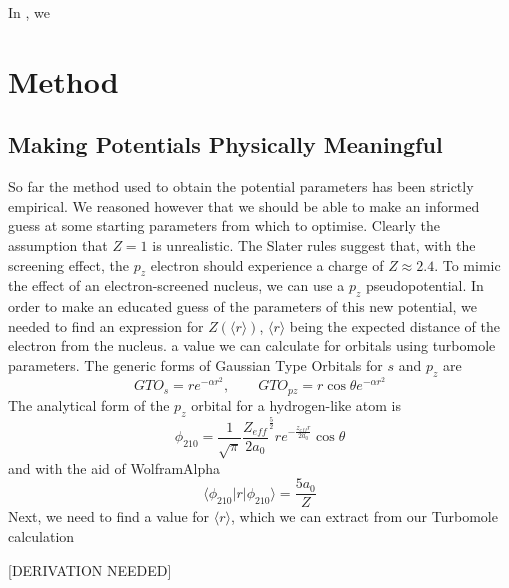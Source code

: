 \documentclass[journal=jctcce,manuscript=article]{achemso}
\begin{document}
In \cite{drujon_pseudopotentials_2013}, we 

\section{Method}

\subsection{Making Potentials Physically Meaningful}

So far the method used to obtain the potential parameters has been strictly empirical. We reasoned however that we should be able to make an informed guess at some starting parameters from which to optimise. Clearly the assumption that \(Z = 1\) is unrealistic. The Slater rules suggest that, with the screening effect, the \(p_{z}\) electron should experience a charge of \(Z \approx 2.4\). To mimic the effect of an electron-screened nucleus, we can use a \(p_{z}\) pseudopotential. In order to make an educated guess of the parameters of this new potential, we needed to find an expression for \(Z(\langle r \rangle)\), \( \langle r \rangle \) being the expected distance of the electron from the nucleus. a value we can calculate for orbitals using turbomole parameters.
	The generic forms of Gaussian Type Orbitals for \(s\) and \(p_{z}\) are
\begin{equation}
GTO_{s} = re^{-\alpha r^{2}},\qquad	GTO_{pz} = r \cos \theta e^{-\alpha r^{2}}
\end{equation}
The analytical form of the \(p_{z}\) orbital for a hydrogen-like atom is
\begin{equation}
\phi_{210} = \frac{1}{\sqrt{\pi}} \frac{Z_{eff}}{2a_{0}} ^{\frac{5}{2}} re^{-\frac{z_{eff}r}{2a_{0}}} \cos \theta
\end{equation}
and with the aid of WolframAlpha
\begin{equation}
\langle \phi_{210} | r | \phi_{210} \rangle = \frac{5a_{0}}{Z}
\end{equation}
Next, we need to find a value for \( \langle r \rangle \), which we can extract from our Turbomole calculation

[DERIVATION NEEDED]
\end{document}
